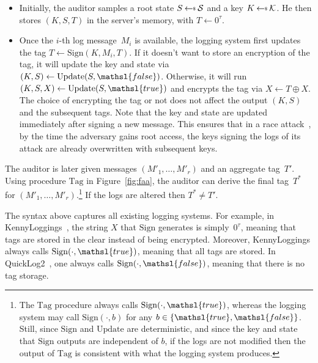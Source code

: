 \documentclass[sigconf]{sty/acmart}
\newcommand{\qltwo}{QuickLog2\xspace}
\newcommand{\kl}{KennyLoggings\xspace}
\newcommand{\calK}{{\mathcal K}}
\newcommand{\figref}[1]{Figure~\ref{#1}}
\newcommand{\getsr}{{\:{\leftarrow{\hspace*{-3pt}\raisebox{.75pt}{$\scriptscriptstyle\$$}}}\:}}
\newcommand{\true}{\mathsl{true}}
\newcommand{\Update}{\mathrm{Update}}
\newcommand{\Sign}{\mathrm{Sign}}
\newcommand{\calS}{{\mathcal S}}
\newcommand{\Agg}{\mathrm{Tag}}
\newcommand{\xor}{\oplus}
\newcommand{\false}{\mathsl{false}}
\begin{document}
\begin{itemize}[leftmargin=*]
\item Initially, 
the auditor samples a root state $S \getsr \calS$ and a key $K \getsr \calK$. 
He then stores $(K, S, T)$ in the server's memory, with $T \gets 0^\tau$. 




\item Once the $i$-th log message~$M_i$ is available, 
the logging system first updates the tag $T \gets \Sign(K, M_i, T)$. 
If it doesn't want to store an encryption of the tag, 
it will update the key and state via $(K, S) \gets \Update(S, \false)$. 
Otherwise, it will run $(K, S, X) \gets \Update(S, \true)$ and 
encrypts the tag via $X \gets T \xor X$.
The choice of encrypting the tag or not does not affect the output $(K, S)$
and the subsequent tags.  
Note that the key and state are updated immediately after signing a new message. 
This ensures that in a race attack~\cite{kennylog}, 
by the time the adversary gains root access, the keys signing the logs of its attack are already overwritten with subsequent keys. 
\end{itemize}
The auditor is later given  messages $(M'_1, \ldots, M'_r)$ and an aggregate tag~$T'$. 
Using procedure $\Agg$ in \figref{fig:faa},  the auditor can derive the final tag~$T^*$
for $(M'_1, \ldots, M'_r)$.\footnote{The $\Agg$ procedure always calls  $\Sign(\cdot, \true)$, 
whereas the logging system may call  $\Sign(\cdot, b)$ for any $b \in \{\true, \false\}$.  
Still, since $\Sign$ and $\Update$ are deterministic, and since the key and state that $\Sign$ outputs are independent of $b$, 
if the logs are not modified then the output of $\Agg$ is consistent with what the logging system produces. 
} 
If the logs are altered then $T^* \ne T'$.

 


\smallskip 
The syntax above captures all existing logging systems. 
For example, in \kl~\cite{kennylog}, the string $X$ that $\Sign$ generates is simply~$0^\tau$, meaning that tags are stored in the clear instead of being encrypted. 
Moreover, \kl always calls $\Sign(\cdot, \true)$, meaning that all tags are stored. 
In \qltwo~\cite{281386}, one always calls $\Sign(\cdot, \false)$, meaning that there is no tag storage. 



 
\end{document}
